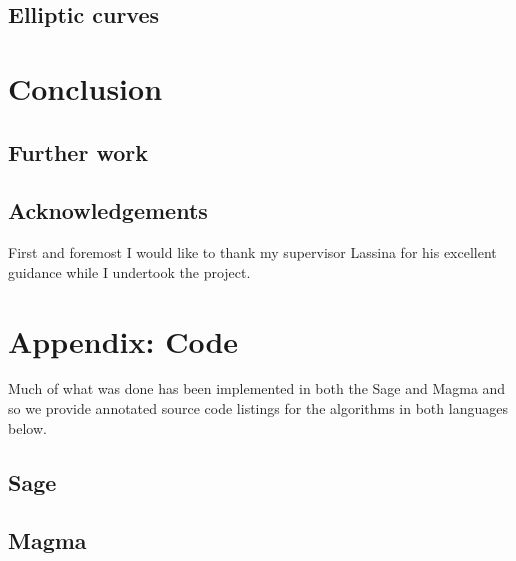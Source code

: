 \documentclass[11pt,a4paper]{report}
\theoremstyle{definition}
\begin{document}
\section{Elliptic curves}
\label{sec:ell}

\chapter{Conclusion}


\section{Further work}


\section{Acknowledgements}
First and foremost I would like to thank my supervisor Lassina for his excellent guidance while I undertook the project.

\chapter{Appendix: Code}

Much of what was done has been implemented in both the Sage and Magma and so we provide annotated source code listings for the algorithms in both languages below.
 
\section{Sage}


\section{Magma}



\nocite{*}


\end{document}
